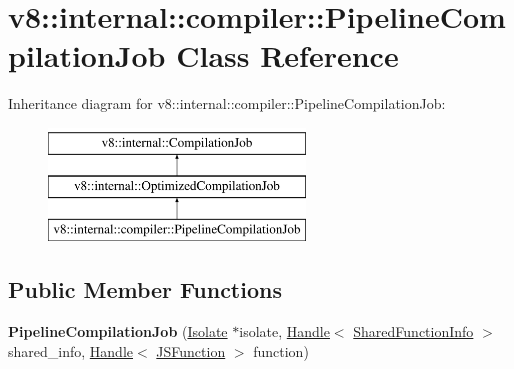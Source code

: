 \hypertarget{classv8_1_1internal_1_1compiler_1_1PipelineCompilationJob}{}\section{v8\+:\+:internal\+:\+:compiler\+:\+:Pipeline\+Compilation\+Job Class Reference}
\label{classv8_1_1internal_1_1compiler_1_1PipelineCompilationJob}
Inheritance diagram for v8\+:\+:internal\+:\+:compiler\+:\+:Pipeline\+Compilation\+Job\+:\begin{figure}[H]
\begin{center}
\leavevmode
\includegraphics[height=3.000000cm]{classv8_1_1internal_1_1compiler_1_1PipelineCompilationJob}
\end{center}
\end{figure}
\subsection*{Public Member Functions}
\begin{DoxyCompactItemize}
\item 
\mbox{\label{classv8_1_1internal_1_1compiler_1_1PipelineCompilationJob_a9c3b948269421a9639de7a2ed6b1d591}} 
{\bfseries Pipeline\+Compilation\+Job} (\mbox{\hyperlink{classv8_1_1internal_1_1Isolate}{Isolate}} $\ast$isolate, \mbox{\hyperlink{classv8_1_1internal_1_1Handle}{Handle}}$<$ \mbox{\hyperlink{classv8_1_1internal_1_1SharedFunctionInfo}{Shared\+Function\+Info}} $>$ shared\+\_\+info, \mbox{\hyperlink{classv8_1_1internal_1_1Handle}{Handle}}$<$ \mbox{\hyperlink{classv8_1_1internal_1_1JSFunction}{J\+S\+Function}} $>$ function)
\end{DoxyCompactItemize}
